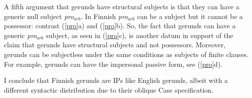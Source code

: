 \documentclass[output=paper,
modfonts
]{LSP/langsci}
\newcommand{\rfa}[2]{(\ref{#1}{#2})}
\begin{document}
A fifth argument that gerunds have structural subjects is that they can have a
generic null subject \textit{pro$_{arb}$}. In Finnish \textit{pro$_{arb}$} can be a subject \citep{hakulinen1973} but it cannot be
a possessor: contrast \rfa{pro}{a} and \rfa{pro}{b}.  So, the fact that gerunds can have a generic
\textit{pro$_{arb}$} subject, as seen in \rfa{pro}{c}, is another datum in support of the claim
that gerunds have structural subjects and not possessors.  Moreover, gerunds can be subjectless
under the same conditions as subjects of finite clauses.  For example, gerunds can have the
impersonal passive form, see \rfa{pro}{d}.
\begin{exe}
\ex\label{pro}
	\begin{xlist}



	\end{xlist}
\end{exe}

I conclude that Finnish gerunds are IPs like English gerunds, albeit with a different syntactic
distribution due to their oblique Case specification.
\end{document}
